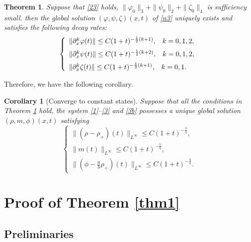 \documentclass[11pt]{article}
\theoremstyle{plain}
\newtheorem{theorem}{Theorem}[section]
\newtheorem{corollary}{Corollary}[section]
\numberwithin{equation}{section}
\begin{document}
	\begin{theorem}\label{thm3}
		Suppose that \eqref{23} holds, $\|\varphi_{0}\|_{3}+\|\psi_{0}\|_{2}+\|\zeta_{0}\|_{4}$ is sufficiency small.
		then the global solution $(\varphi,\psi,\zeta)(x,t)$ of \eqref{n3} uniquely exists and satisfies the following decay rates:
		\begin{equation}\notag
			\left\{
			\begin{array}{lr}
				\|\partial_x^k\varphi(t)\|\leq C (1+t)^{-\frac{1}{2}(k+1)},\;\;\;k=0,1,2,\\[2mm]
				\|\partial_x^k\psi(t)\|\leq C (1+t)^{-\frac{1}{2}(k+2)},\;\;\;k=0,1,2,\\[2mm]
				\|\partial_x^k\zeta(t)\|\leq C (1+t)^{-\frac{1}{2}(k+1)},\;\;\;k=0,1.
			\end{array}
			\right.
		\end{equation}
	\end{theorem}
	Therefore, we have the following corollary.	
\begin{corollary}[{\rm Converge to constant states}]
		Suppose that all the conditions in
		Theorem \ref{thm3} hold, the system \eqref{1}--\eqref{3} and \eqref{3b}  possesses a unique global solution $(\rho,m,\phi)(x,t)$ satisfying
		\begin{equation}\label{22b}
			\left\{
			\begin{array}{lr}
				\|(\rho-\rho_+)(t)\|_{L^{\infty}}\leq C (1+t)^{-\frac{3}{4}},\\[2mm]
				\| m(t)\|_{L^{\infty}}\leq C (1+t)^{-\frac{5}{4}},\\[2mm]
				\|\left(\phi-\frac{a}{b}\rho_{+}\right)(t)\|_{L^{\infty}}\leq C (1+t)^{-\frac{3}{4}}.	
			\end{array}
			\right.
		\end{equation}
	\end{corollary}

\section{Proof of Theorem \ref{thm1}}\label{s3}
\subsection{Preliminaries}
\end{document}
